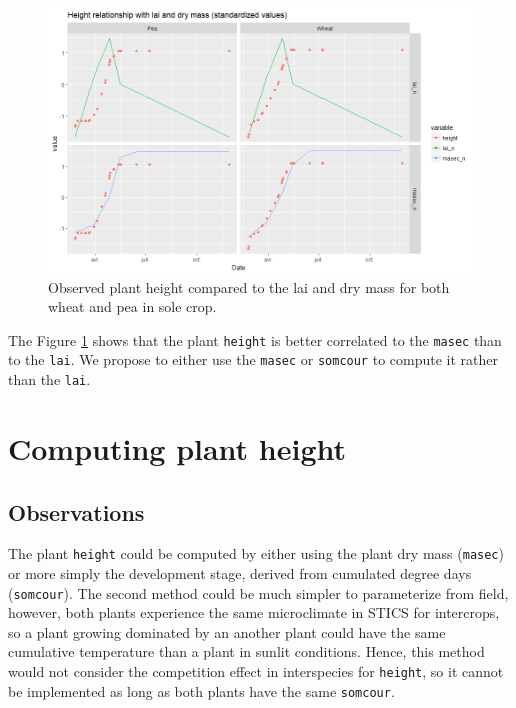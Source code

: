\documentclass[
]{book}
\begin{document}
\begin{figure}
\centering
\includegraphics{img/height2.png}
\caption{\label{fig:height2}Observed plant height compared to the lai and dry mass for both wheat and pea in sole crop.}
\end{figure}

The Figure \ref{fig:height2} shows that the plant \texttt{height} is better correlated to the \texttt{masec} than to the \texttt{lai}. We propose to either use the \texttt{masec} or \texttt{somcour} to compute it rather than the \texttt{lai}.

\hypertarget{computing-plant-height}{%
\section{Computing plant height}\label{computing-plant-height}}

\hypertarget{observations}{%
\subsection{Observations}\label{observations}}

The plant \texttt{height} could be computed by either using the plant dry mass (\texttt{masec}) or more simply the development stage, derived from cumulated degree days (\texttt{somcour}).
The second method could be much simpler to parameterize from field, however, both plants experience the same microclimate in STICS for intercrops, so a plant growing dominated by an another plant could have the same cumulative temperature than a plant in sunlit conditions. Hence, this method would not consider the competition effect in interspecies for \texttt{height}, so it cannot be implemented as long as both plants have the same \texttt{somcour}.
\end{document}
